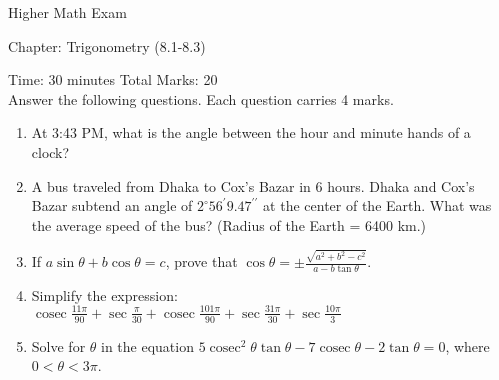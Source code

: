 \documentclass[12pt]{article}
\newcommand{\cosec}{\mathop{\mathrm{cosec}}}
\begin{document}
\begin{Large}
    \begin{center}
        Higher Math Exam

        Chapter: Trigonometry (8.1-8.3)
    \end{center}
\end{Large}
\begin{large}
    Time: 30 minutes \hfill Total Marks: 20\\[40pt]
    \noindent Answer the following questions. Each question carries 4 marks.

    \begin{enumerate}
        \item At 3:43 PM, what is the angle between the hour and minute hands of a clock?
        \item A bus traveled from Dhaka to Cox's Bazar in 6 hours. Dhaka and Cox's Bazar subtend an angle of $2^\circ 56^\prime 9.47^{\prime\prime}$ at the center of the Earth. What was the average speed of the bus? (Radius of the Earth = 6400 km.)
        \item If $a\sin\theta + b\cos\theta = c$, prove that $\cos\theta = \pm \displaystyle \frac{\sqrt{a^2 + b^2 - c^2}}{a - b\tan\theta}$.
        \item Simplify the expression:\\
        $\displaystyle \cosec\frac{11\pi}{90} + \sec\frac{\pi}{30} + \cosec\frac{101\pi}{90} + \sec\frac{31\pi}{30} + \sec\frac{10\pi}{3}$
        \item Solve for $\theta$ in the equation $5\cosec^2\theta \tan\theta - 7\cosec\theta - 2\tan\theta = 0$, where $0 < \theta < 3\pi$.
    \end{enumerate}
\end{large}
\end{document}
